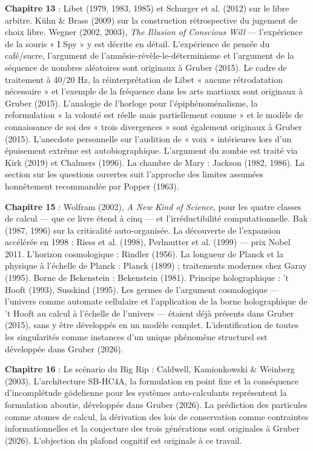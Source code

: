 \documentclass[11pt, twoside, openright]{book}
\begin{document}
\textbf{Chapitre 13} : Libet (1979, 1983, 1985) et Schurger et al. (2012) sur le libre arbitre. Kühn \& Brass (2009) sur la construction rétrospective du jugement de choix libre. Wegner (2002, 2003), \textit{The Illusion of Conscious Will} --- l'expérience de la souris « I Spy » y est décrite en détail. L'expérience de pensée du café/\allowbreak{}sucre, l'argument de l'amnésie-révèle-le-déterminisme et l'argument de la séquence de nombres aléatoires sont originaux à Gruber (2015). Le cadre de traitement à 40/\allowbreak{}20 Hz, la réinterprétation de Libet « aucune rétrodatation nécessaire » et l'exemple de la fréquence dans les arts martiaux sont originaux à Gruber (2015). L'analogie de l'horloge pour l'épiphénoménalisme, la reformulation « la volonté est réelle mais partiellement connue » et le modèle de connaissance de soi des « trois divergences » sont également originaux à Gruber (2015). L'anecdote personnelle sur l'audition de « voix » intérieures lors d'un épuisement extrême est autobiographique. L'argument du zombie est traité via Kirk (2019) et Chalmers (1996). La chambre de Mary : Jackson (1982, 1986). La section sur les questions ouvertes suit l'approche des limites assumées honnêtement recommandée par Popper (1963).

\textbf{Chapitre 15} : Wolfram (2002), \textit{A New Kind of Science}, pour les quatre classes de calcul --- que ce livre étend à cinq --- et l'irréductibilité computationnelle. Bak (1987, 1996) sur la criticalité auto-organisée. La découverte de l'expansion accélérée en 1998 : Riess et al. (1998), Perlmutter et al. (1999) --- prix Nobel 2011. L'horizon cosmologique : Rindler (1956). La longueur de Planck et la physique à l'échelle de Planck : Planck (1899) ; traitements modernes chez Garay (1995). Borne de Bekenstein : Bekenstein (1981). Principe holographique : 't Hooft (1993), Susskind (1995). Les germes de l'argument cosmologique --- l'univers comme automate cellulaire et l'application de la borne holographique de 't Hooft au calcul à l'échelle de l'univers --- étaient déjà présents dans Gruber (2015), sans y être développés en un modèle complet. L'identification de toutes les singularités comme instances d'un unique phénomène structurel est développée dans Gruber (2026).

\textbf{Chapitre 16} : Le scénario du Big Rip : Caldwell, Kamionkowski \& Weinberg (2003). L'architecture SB-HC4A, la formulation en point fixe et la conséquence d'incomplétude gödelienne pour les systèmes auto-calculants représentent la formulation aboutie, développée dans Gruber (2026). La prédiction des particules comme atomes de calcul, la dérivation des lois de conservation comme contraintes informationnelles et la conjecture des trois générations sont originales à Gruber (2026). L'objection du plafond cognitif est originale à ce travail.
\end{document}
